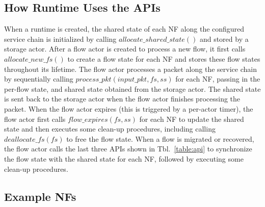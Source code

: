\subsection{How Runtime Uses the APIs}

When a runtime is created, the shared state of each NF along the configured service chain is initialized by calling $allocate\_shared\_state()$ and stored by a storage actor. After a flow actor is created to process a new flow, it first calls $allocate\_new\_fs()$ to create a flow state for each NF and stores these flow states throughout its lifetime. The flow actor processes a packet along the service chain by sequentially calling $process\_pkt(input\_pkt, fs, ss)$ for each NF, passing in the per-flow state, and shared state obtained from the storage actor. The shared state is sent back to the storage actor when the flow actor finishes processing the packet. When the flow actor expires (this is triggered by a per-actor timer), the flow actor first calls $flow\_expires(fs, ss)$ for each NF to update the shared state and then executes some clean-up procedures, including calling $deallocate\_fs(fs)$ to free the flow state. When a flow is migrated or recovered, the flow actor calls the last three APIs shown in Tbl.~\ref{table:api} to synchronize the flow state with the shared state for each NF, followed by executing some clean-up procedures.

\subsection {Example NFs}

